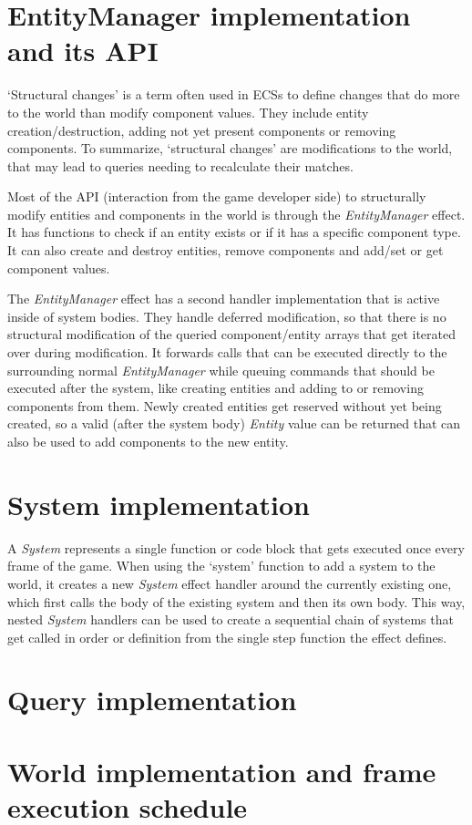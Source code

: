 \section{EntityManager implementation and its API}

`Structural changes' is a term often used in ECSs to define changes that do more to the world than modify component values. They include entity creation/destruction, adding not yet present components or removing components. To summarize, `structural changes' are modifications to the world, that may lead to queries needing to recalculate their matches.

Most of the API (interaction from the game developer side) to structurally modify entities and components in the world is through the \textit{EntityManager} effect. It has functions to check if an entity exists or if it has a specific component type. It can also create and destroy entities, remove components and add/set or get component values.

The \textit{EntityManager} effect has a second handler implementation that is active inside of system bodies. They handle deferred modification, so that there is no structural modification of the queried component/entity arrays that get iterated over during modification. It forwards calls that can be executed directly to the surrounding normal \textit{EntityManager} while queuing commands that should be executed after the system, like creating entities and adding to or removing components from them. Newly created entities get reserved without yet being created, so a valid (after the system body) \textit{Entity} value can be returned that can also be used to add components to the new entity.

\section{System implementation}

A \textit{System} represents a single function or code block that gets executed once every frame of the game. When using the `system' function to add a system to the world, it creates a new \textit{System} effect handler around the currently existing one, which first calls the body of the existing system and then its own body. This way, nested \textit{System} handlers can be used to create a sequential chain of systems that get called in order or definition from the single step function the effect defines.

\section{Query implementation}



\section{World implementation and frame execution schedule}


